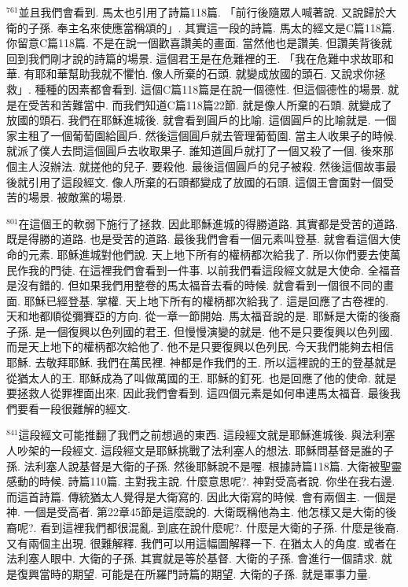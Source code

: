 \documentclass{book}
\begin{document}
$^{761}$並且我們會看到.
馬太也引用了詩篇118篇.
「前行後隨眾人喊著說.
又說歸於大衛的子孫.
奉主名來使應當稱頌的」.
其實這一段的詩篇.
馬太的經文是C篇118篇.
你留意C篇118篇.
不是在說一個歡喜讚美的畫面.
當然他也是讚美.
但讚美背後就回到我們剛才說的詩篇的場景.
這個君王是在危難裡的王.
「我在危難中求故耶和華.
有耶和華幫助我就不懼怕.
像人所棄的石頭.
就變成放國的頭石.
又說求你拯救」.
種種的因素都會看到.
這個C篇118篇是在說一個德性.
但這個德性的場景.
就是在受苦和苦難當中.
而我們知道C篇118篇22節.
就是像人所棄的石頭.
就變成了放國的頭石.
我們在耶穌進城後.
就會看到圓戶的比喻.
這個圓戶的比喻就是.
一個家主租了一個葡萄園給圓戶.
然後這個圓戶就去管理葡萄園.
當主人收果子的時候.
就派了僕人去問這個圓戶去收取果子.
誰知道圓戶就打了一個又殺了一個.
後來那個主人沒辦法.
就搓他的兒子.
要殺他.
最後這個圓戶的兒子被殺.
然後這個故事最後就引用了這段經文.
像人所棄的石頭都變成了放國的石頭.
這個王會面對一個受苦的場景.
被敵黨的場景.

$^{801}$在這個王的軟弱下施行了拯救.
因此耶穌進城的得勝道路.
其實都是受苦的道路.
既是得勝的道路.
也是受苦的道路.
最後我們會看一個元素叫登基.
就會看這個大使命的元素.
耶穌進城對他們說.
天上地下所有的權柄都次給我了.
所以你們要去使萬民作我的門徒.
在這裡我們會看到一件事.
以前我們看這段經文就是大使命.
全福音是沒有錯的.
但如果我們用整卷的馬太福音去看的時候.
就會看到一個很不同的畫面.
耶穌已經登基.
掌權.
天上地下所有的權柄都次給我了.
這是回應了古卷裡的.
天和地都順從彌賽亞的方向.
從一章一節開始.
馬太福音說的是.
耶穌是大衛的後裔子孫.
是一個復興以色列國的君王.
但慢慢演變的就是.
他不是只要復興以色列國.
而是天上地下的權柄都次給他了.
他不是只要復興以色列民.
今天我們能夠去相信耶穌.
去敬拜耶穌.
我們在萬民裡.
神都是作我們的王.
所以這裡說的王的登基就是從猶太人的王.
耶穌成為了叫做萬國的王.
耶穌的釘死.
也是回應了他的使命.
就是要拯救人從罪裡面出來.
因此我們會看到.
這四個元素是如何串連馬太福音.
最後我們要看一段很難解的經文.

$^{841}$這段經文可能推翻了我們之前想過的東西.
這段經文就是耶穌進城後.
與法利塞人吵架的一段經文.
這段經文是耶穌挑戰了法利塞人的想法.
耶穌問基督是誰的子孫.
法利塞人說基督是大衛的子孫.
然後耶穌說不是喔.
根據詩篇118篇.
大衛被聖靈感動的時候.
詩篇110篇.
主對我主說.
什麼意思呢?.
神對受高者說.
你坐在我右邊.
而這首詩篇.
傳統猶太人覺得是大衛寫的.
因此大衛寫的時候.
會有兩個主.
一個是神.
一個是受高者.
第22章45節是這麼說的.
大衛既稱他為主.
他怎樣又是大衛的後裔呢?.
看到這裡我們都很混亂.
到底在說什麼呢?.
什麼是大衛的子孫.
什麼是後裔.
又有兩個主出現.
很難解釋.
我們可以用這幅圖解釋一下.
在猶太人的角度.
或者在法利塞人眼中.
大衛的子孫.
其實就是等於基督.
大衛的子孫.
會進行一個請求.
就是復興當時的期望.
可能是在所羅門詩篇的期望.
大衛的子孫.
就是軍事力量.
\end{document}
